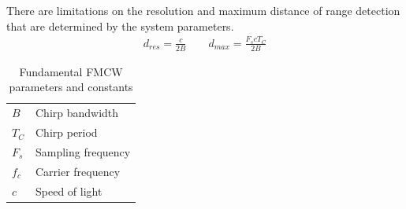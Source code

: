 \documentclass{article}
\begin{document}
There are limitations on the resolution and maximum distance of range detection
that are determined by the system parameters.
\begin{gather*}
    d_{res} = \frac{c}{2B} \qquad
    d_{max} = \frac{F_s c T_C}{2B}
\end{gather*}\vspace{-1.5em}
\begin{table}[H]
    \centering
    \begin{tabular}{ll}
        \toprule
        \midrule
        $B$ & Chirp bandwidth \\
        $T_C$ & Chirp period \\
        $F_s$ & Sampling frequency \\
        $f_c$ & Carrier frequency \\
        $c$ & Speed of light \\
        \bottomrule
    \end{tabular}
    \caption{Fundamental FMCW parameters and constants}
\end{table}
\end{document}
